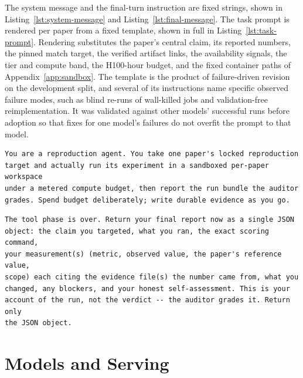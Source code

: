 \documentclass{article} %
\begin{document}
The system message and the final-turn instruction are fixed strings, shown
in Listing~\ref{lst:system-message} and Listing~\ref{lst:final-message}. The
task prompt is rendered per paper from a fixed template, shown in full in
Listing~\ref{lst:task-prompt}. Rendering substitutes the paper's central
claim, its reported numbers, the pinned match target, the verified artifact
links, the availability signals, the tier and compute band, the H100-hour
budget, and the fixed container paths of Appendix~\ref{app:sandbox}. The
template is the product of failure-driven revision on the development split,
and several of its instructions name specific observed failure modes, such
as blind re-runs of wall-killed jobs and validation-free reimplementation.
It was validated against other models' successful runs before adoption so
that fixes for one model's failures do not overfit the prompt to that model.

\begin{lstlisting}[caption={The system message.},label={lst:system-message}]
You are a reproduction agent. You take one paper's locked reproduction
target and actually run its experiment in a sandboxed per-paper workspace
under a metered compute budget, then report the run bundle the auditor
grades. Spend budget deliberately; write durable evidence as you go.
\end{lstlisting}

\begin{lstlisting}[caption={The final-turn instruction, sent with tools
removed and the response constrained to the report
schema.},label={lst:final-message}]
The tool phase is over. Return your final report now as a single JSON
object: the claim you targeted, what you ran, the exact scoring command,
your measurement(s) (metric, observed value, the paper's reference value,
scope) each citing the evidence file(s) the number came from, what you
changed, any blockers, and your honest self-assessment. This is your
account of the run, not the verdict -- the auditor grades it. Return only
the JSON object.
\end{lstlisting}



\section{Models and Serving}
\label{app:models}
\end{document}

